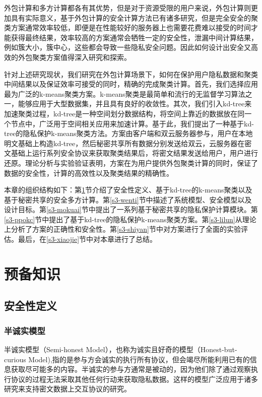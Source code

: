 外包计算和多方计算都各有其优势，但是对于资源受限的用户来说，外包计算则更加具有实际意义，基于外包计算的安全计算方法已有诸多研究，但是完全安全的聚类方案通常效率较低，即便是在性能较好的服务器上也需要花费难以接受的时间才能获得最终结果，效率较高的方案通常会牺牲一定的安全性，泄漏中间计算结果，例如簇大小，簇中心，这些都会导致一些隐私安全问题。因此如何设计出安全又高效的外包聚类方案值得深入研究和探索。

针对上述研究现状，我们研究在外包计算场景下，如何在保护用户隐私数据和聚类中间结果以及保证效率可接受的同时，精确的完成聚类计算。首先，我们选择应用最为广泛的k-means聚类方案。k-means聚类是最简单和流行的无监督学习算法之一，能够应用于大型数据集，并且具有良好的收敛性。其次，我们引入kd-tree来加速聚类过程，kd-tree是一种空间划分数据结构，将空间上靠近的数据放在同一个节点中，广泛用于空间相关应用来加速计算。基于此，我们提出了一种基于kd-tree的隐私保护k-means聚类方法。方案由客户端和双云服务器参与，用户在本地明文基础上构造kd-tree，然后秘密共享所有数据分别发送给双云，云服务器在密文基础上运行系列安全协议来获取聚类结果后，将密文结果发送给用户，用户进行还原。理论分析与实验验证表明，方案在为用户提供外包聚类计算的同时，保证了数据的安全性，计算的高效性以及聚类结果的精确性。

本章的组织结构如下：第\ref{s3-yubei}节介绍了安全性定义、基于kd-tree的k-means聚类以及基于秘密共享的安全多方计算。第\ref{s3-wenti}节中描述了系统模型、安全模型以及设计目标。第\ref{s3-mokuai}节中提出了一系列基于秘密共享的隐私保护计算模块。第\ref{s3-ppokc}节中提出了基于kd-tree的隐私保护k-means聚类方案。第\ref{s3-lilun}从理论上分析了方案的正确性和安全性。第\ref{s3-shiyan}节中对方案进行了全面的实验评估。最后，在\ref{s3-xiaojie}节中对本章进行了总结。

\section{预备知识}
\label{s3-yubei}
\subsection{安全性定义}
\subsubsection{半诚实模型}
半诚实模型（Semi-honest Model），也称为诚实且好奇的模型（Honest-but-curious Model),指的是参与方会诚实的执行所有协议，但会竭尽所能利用已有的信息获取尽可能多的内容。半诚实的参与方通常是被动的，因为他们除了通过观察执行协议的过程无法采取其他任何行动来获取隐私数据。这样的模型广泛应用于诸多研究来支持密文数据上交互协议的研究。

